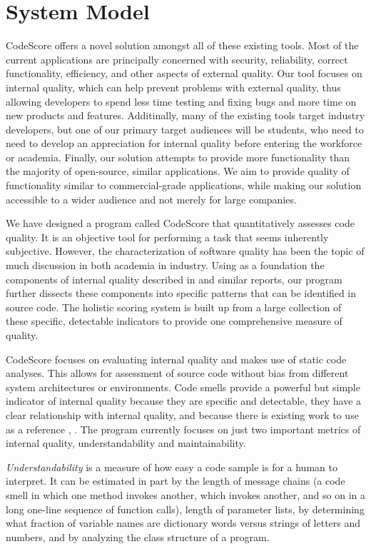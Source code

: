 \documentclass{sig-alternate}
\begin{document}
\section{System Model}
\label{sec:system_model}


CodeScore offers a novel solution amongst all of these existing tools.
Most of the current applications are principally concerned with security,
reliability, correct functionality, efficiency, and other aspects of external quality. Our tool 
focuses on internal quality, which can help prevent problems with external
quality, thus allowing developers to spend less time testing and fixing bugs and
more time on new products and features. Additinally, many of the existing tools
target industry developers, but one of our primary target audiences will be
students, who need to need to develop an appreciation for internal quality
before entering the workforce or academia. Finally, our solution attempts to
provide more functionality than the majority of open-source, similar
applications. We aim to provide quality of functionality similar to
commercial-grade applications, while making our solution accessible to a wider
audience and not merely for large companies. 

We have designed a program called CodeScore that quantitatively assesses code
quality. It is an objective tool for performing a task that seems inherently
subjective. However, the characterization of software quality has been the topic
of much discussion in both academia in industry. Using as a foundation the
components of internal quality described in \cite{iso2011iec} and similar
reports, our program further dissects these components into specific patterns
that can be identified in source code. The holistic scoring system is built up
from a large collection of these specific, detectable indicators to provide one
comprehensive measure of quality.

CodeScore focuses on evaluating internal quality and makes use of static code
analyses. This allows for assessment of source code without bias from different
system architectures or environments. Code smells provide a powerful but simple
indicator of internal quality because they are specific and detectable, they
have a clear relationship with internal quality, and because there is
existing work to use as a reference \cite{moha2009duchien}, \cite{palomba}. The
program currently focuses on just two important metrics of internal quality,
understandability and maintainability. 

\emph{Understandability} is a measure of how easy a code sample is for a human to
interpret. It can be estimated in part by the length of message chains (a code
smell in which one method invokes another, which invokes another, and so on in a
long one-line sequence of function calls), length of parameter lists, by
determining what fraction of variable names are dictionary words versus strings
of letters and numbers, and by analyzing the class structure of a program. 
\end{document}
